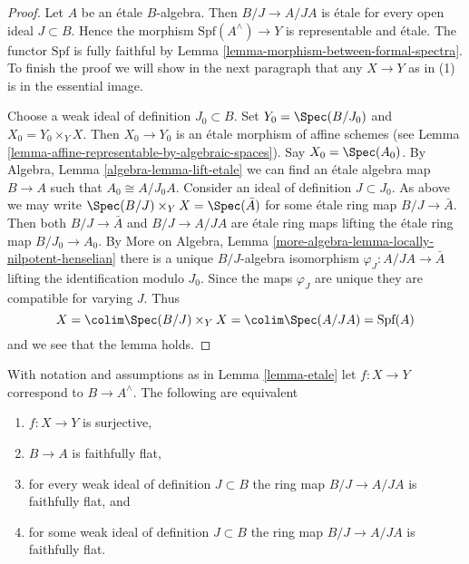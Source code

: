 \begin{proof}
Let $A$ be an \'etale $B$-algebra. Then $B/J \to A/JA$ is
\'etale for every open ideal $J \subset B$. Hence
the morphism $\text{Spf}(A^\wedge) \to Y$ is representable and \'etale.
The functor $\text{Spf}$ is fully faithful by
Lemma \ref{lemma-morphism-between-formal-spectra}.
To finish the proof we will show in the next paragraph
that any $X \to Y$ as in (1) is in the essential image.

\medskip\noindent
Choose a weak ideal of definition $J_0 \subset B$. Set
$Y_0 = \Spec(B/J_0)$ and $X_0 = Y_0 \times_Y X$. Then $X_0 \to Y_0$
is an \'etale morphism of affine schemes (see
Lemma \ref{lemma-affine-representable-by-algebraic-spaces}).
Say $X_0 = \Spec(A_0)$. By Algebra, Lemma \ref{algebra-lemma-lift-etale}
we can find an \'etale algebra map $B \to A$ such that
$A_0 \cong A/J_0A$. Consider an ideal of definition $J \subset J_0$.
As above we may write $\Spec(B/J) \times_Y X = \Spec(\bar A)$
for some \'etale ring map $B/J \to \bar A$. Then both
$B/J \to \bar A$ and $B/J \to A/JA$ are \'etale ring maps
lifting the \'etale ring map $B/J_0 \to A_0$. By
More on Algebra, Lemma \ref{more-algebra-lemma-locally-nilpotent-henselian}
there is a unique $B/J$-algebra isomorphism
$\varphi_J : A/JA \to \bar A$ lifting the identification modulo $J_0$.
Since the maps $\varphi_J$ are unique they are compatible for varying $J$.
Thus
$$
X = \colim \Spec(B/J) \times_Y X = \colim \Spec(A/JA) = \text{Spf}(A)
$$
and we see that the lemma holds.
\end{proof}

\begin{lemma}
\label{lemma-etale-surjective}
With notation and assumptions as in Lemma \ref{lemma-etale} let
$f : X \to Y$ correspond to $B \to A^\wedge$. The following are equivalent
\begin{enumerate}
\item $f : X \to Y$ is surjective,
\item $B \to A$ is faithfully flat,
\item for every weak ideal of definition $J \subset B$
the ring map $B/J \to A/JA$ is faithfully flat, and
\item for some weak ideal of definition $J \subset B$
the ring map $B/J \to A/JA$ is faithfully flat.
\end{enumerate}
\end{lemma}

